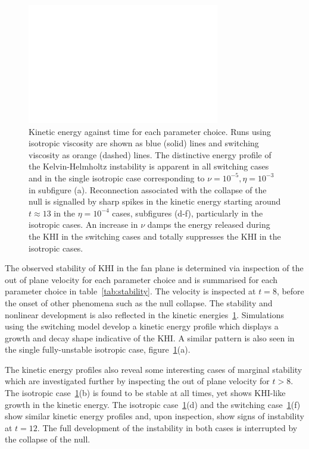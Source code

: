 \begin{figure}[h]
  \centering
  \includegraphics[width=\linewidth]{param_study/kinetic_energies.pdf}
  \caption{Kinetic energy against time for each parameter choice. Runs using isotropic viscosity are shown as blue (solid) lines and switching viscosity as orange (dashed) lines. The distinctive energy profile of the Kelvin-Helmholtz instability is apparent in all switching cases and in the single isotropic case corresponding to $\nu = 10^{-5}, \eta = 10^{-3}$ in subfigure (a). Reconnection associated with the collapse of the null is signalled by sharp spikes in the kinetic energy starting around $t\approx13$ in the $\eta = 10^{-4}$ cases, subfigures (d-f), particularly in the isotropic cases. An increase in $\nu$ damps the energy released during the KHI in the switching cases and totally suppresses the KHI in the isotropic cases.}%
  \label{fig:param_study_kinetic_energies}
\end{figure}

The observed stability of KHI in the fan plane is determined via inspection of the out of plane velocity for each parameter choice and is summarised for each parameter choice in table~\ref{tab:stability}. The velocity is inspected at $t=8$, before the onset of other phenomena such as the null collapse. The stability and nonlinear development is also reflected in the kinetic energies~\ref{fig:param_study_kinetic_energies}. Simulations using the switching model develop a kinetic energy profile which displays a growth and decay shape indicative of the KHI. A similar pattern is also seen in the single fully-unstable isotropic case, figure~\ref{fig:param_study_kinetic_energies}(a).

The kinetic energy profiles also reveal some interesting cases of marginal stability which are investigated further by inspecting the out of plane velocity for $t>8$. The isotropic case~\ref{fig:param_study_kinetic_energies}(b) is found to be stable at all times, yet shows KHI-like growth in the kinetic energy. The isotropic case~\ref{fig:param_study_kinetic_energies}(d) and the switching case~\ref{fig:param_study_kinetic_energies}(f) show similar kinetic energy profiles and, upon inspection, show signs of instability at $t=12$. The full development of the instability in both cases is interrupted by the collapse of the null.

